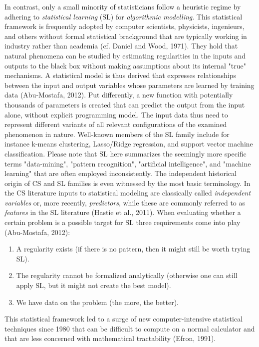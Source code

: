 \documentclass[authoryear,review,3p]{elsarticle}
\begin{document}
In contrast, only a small minority of statisticians
follow a heuristic regime by
adhering to \textit{statistical learning} (SL) for
\textit{algorithmic modelling}.
This statistical framework is frequently adopted by computer scientists,
physicists, ingenieurs, and others without formal statistical brackground
that are typically working in industry
rather than academia (cf. Daniel and Wood, 1971).
%
They hold that natural phenomena
can be studied by estimating regularities in the inputs and
outputs to the black box without making assumptions
about its internal "true" mechanisms.
A statistical model is thus derived that expresses
relationships between the input and output variables
whose parameters are learned by training data (Abu-Mostafa, 2012).
Put differently, a new function with potentially thousands of
parameters is created
that can predict the output from the input alone,
without explicit programming model.
The input data thus need to represent different variants of
all relevant configurations of the examined phenomenon in nature.
Well-known members of
the SL family include for instance k-means clustering,
Lasso/Ridge regression, and support vector machine classification.
%
Please note that SL here summarizes the seemingly more specific terms
"data-mining", "pattern recognition", "artificial intelligence",
and "machine learning" that are often employed inconsistently.
The independent historical origin of CS and SL families is even
witnessed by the most basic terminology. 
In the CS literature inputs to statistical modeling
are classically called \textit{independent variables}
or, more recently, \textit{predictors},
while these are commonly referred to as \textit{features}
in the SL literature (Hastie et al., 2011).
%
When evaluating whether a certain problem is a possible target for SL
three requirements come into play (Abu-Mostafa, 2012):
\begin{enumerate}
  \item A regularity exists
(if there is no pattern, then it might still be worth trying SL).
  \item The regularity cannot be formalized analytically
(otherwise one can still apply SL, but it might not create the best model).
  \item We have data on the problem (the more, the better).
\end{enumerate}
%
This statistical framework led to a surge of new
computer-intensive statistical techniques since 1980
that can be difficult to compute on a normal calculator
and
that are less concerned with mathematical tractability (Efron, 1991).
\end{document}
